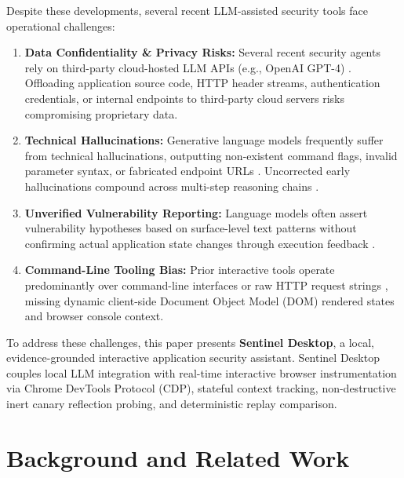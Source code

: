 \documentclass[conference]{IEEEtran}
\begin{document}
Despite these developments, several recent LLM-assisted security tools face operational challenges:
\begin{enumerate}
    \item \textbf{Data Confidentiality \& Privacy Risks:} Several recent security agents rely on third-party cloud-hosted LLM APIs (e.g., OpenAI GPT-4) \cite{fang2024autonomously, deng2024pentestgpt}. Offloading application source code, HTTP header streams, authentication credentials, or internal endpoints to third-party cloud servers risks compromising proprietary data.
    \item \textbf{Technical Hallucinations:} Generative language models frequently suffer from technical hallucinations, outputting non-existent command flags, invalid parameter syntax, or fabricated endpoint URLs \cite{mayoral2023exploitflow, zhang2023snowball, happe2023getting}. Uncorrected early hallucinations compound across multi-step reasoning chains \cite{zhang2023snowball}.
    \item \textbf{Unverified Vulnerability Reporting:} Language models often assert vulnerability hypotheses based on surface-level text patterns without confirming actual application state changes through execution feedback \cite{mayoral2023exploitflow, fang2024autonomously, happe2023getting}.
    \item \textbf{Command-Line Tooling Bias:} Prior interactive tools operate predominantly over command-line interfaces or raw HTTP request strings \cite{deng2024pentestgpt, happe2023getting}, missing dynamic client-side Document Object Model (DOM) rendered states and browser console context.
\end{enumerate}

To address these challenges, this paper presents \textbf{Sentinel Desktop}, a local, evidence-grounded interactive application security assistant. Sentinel Desktop couples local LLM integration with real-time interactive browser instrumentation via Chrome DevTools Protocol (CDP), stateful context tracking, non-destructive inert canary reflection probing, and deterministic replay comparison.

\section{Background and Related Work}
\end{document}
